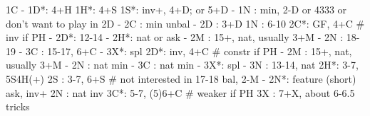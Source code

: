 1C - 
1D*: 4+H
1H*: 4+S
1S*: inv+, 4+D; or 5+D
   - 1N : min, 2-D or 4333 or don't want to play in 2D
   - 2C : min unbal
   - 2D : 3+D
1N : 6-10
2C*: GF, 4+C  # inv if PH
   - 2D*: 12-14
		- 2H*: nat or ask
   - 2M : 15+, nat, usually 3+M
   - 2N : 18-19
   - 3C : 15-17, 6+C
   - 3X*: spl
2D*: inv, 4+C  # constr if PH
   - 2M : 15+, nat, usually 3+M
   - 2N : nat min
   - 3C : nat min
   - 3X*: spl
   - 3N : 13-14, nat
2H*: 3-7, 5S4H(+)
2S : 3-7, 6+S  # not interested in 17-18 bal, 2-M
   - 2N*: feature (short) ask, inv+
2N : nat inv
3C*: 5-7, (5)6+C  # weaker if PH
3X : 7+X, about 6-6.5 tricks
